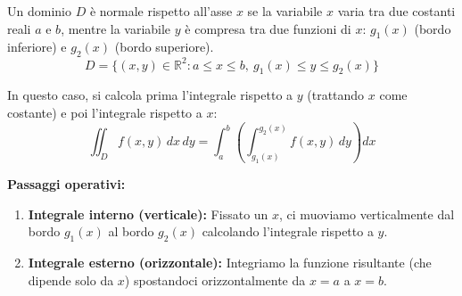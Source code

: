 Un dominio $D$ è normale rispetto all'asse $x$ se la variabile $x$ varia tra due costanti reali $a$ e $b$, mentre la variabile $y$ è compresa tra due funzioni di $x$: $g_1(x)$ (bordo inferiore) e $g_2(x)$ (bordo superiore).
\[
D = \{(x,y) \in \mathbb{R}^2 : a \le x \le b, \ g_1(x) \le y \le g_2(x)\}
\]

\begin{center}
\end{center}

In questo caso, si calcola prima l'integrale rispetto a $y$ (trattando $x$ come costante) e poi l'integrale rispetto a $x$:
\[
\iint_D f(x,y) \, dx \, dy = \int_{a}^{b} \left( \int_{g_1(x)}^{g_2(x)} f(x,y) \, dy \right) dx
\]

\textbf{Passaggi operativi:}
\begin{enumerate}
    \item \textbf{Integrale interno (verticale):} Fissato un $x$, ci muoviamo verticalmente dal bordo $g_1(x)$ al bordo $g_2(x)$ calcolando l'integrale rispetto a $y$.
    \item \textbf{Integrale esterno (orizzontale):} Integriamo la funzione risultante (che dipende solo da $x$) spostandoci orizzontalmente da $x = a$ a $x = b$.
\end{enumerate}

